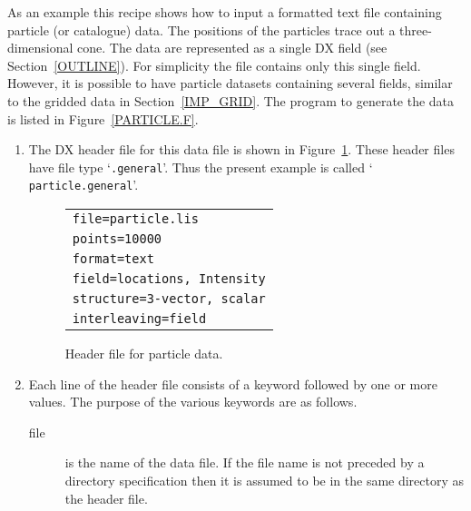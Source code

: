 As an example this recipe shows how to input a formatted text file
containing particle (or catalogue) data. The positions of the particles
trace out a three-dimensional cone. The data are represented as a
single DX field (see Section~\ref{OUTLINE}). For simplicity the file
contains only this single field. However, it is possible to have
particle datasets containing several fields, similar to the gridded
data in Section~\ref{IMP_GRID}. The program to generate the data is listed
in Figure~\ref{PARTICLE.F}.

\begin{enumerate}

  \item The DX header file for this data file is shown in
   Figure~\ref{PARTICLE.GENERAL}. These header files have file type
   `{\tt .general}'. Thus the present example is called `{\tt
   particle.general}'. 

  \begin{figure}[htbp]

  \begin{center}
  \begin{tabular}{l}
   {\tt file=particle.lis}   \\
   {\tt points=10000}        \\
   {\tt format=text}         \\
   {\tt field=locations, Intensity}  \\
   {\tt structure=3-vector, scalar}  \\
   {\tt interleaving=field}  \\
  \end{tabular}
  \end{center}

  \caption[Header file for particle data.]{Header file for particle
   data. \label{PARTICLE.GENERAL} }

  \end{figure}

  \item Each line of the header file consists of a keyword followed by
   one or more values. The purpose of the various keywords are as follows.

  \begin{description}

    \item[file] is the name of the data file. If the file name is not
     preceded by a directory specification then it is assumed to be in
     the same directory as the header file.


\end{description}
\end{enumerate}
